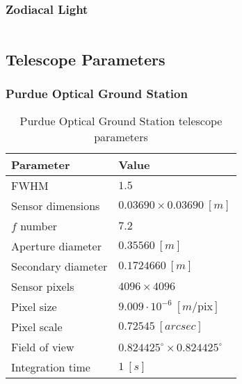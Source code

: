 \subsubsection{Zodiacal Light} \label{data:roach_zod}
\begin{listing}[H]
\inputminted[breaklines=true, breakanywhere=true, breaksymbol=\hspace{0pt}, fontsize=\footnotesize]{json}{/Users/liamrobinson/Documents/PyLightCurves/pyspaceaware/resources/data/zodiacal.json}
\end{listing}

\subsection{Telescope Parameters}

\subsubsection{Purdue Optical Ground Station}

\begin{table}[ht] \label{tb:pogs_parameters}
    \begin{tabular}{|l|l|}
    \hline
    \textbf{Parameter} & \textbf{Value} \\ \hline
    FWHM                & $1.5$                              \\ \hline
    Sensor dimensions    & $ 0.03690 \times 0.03690 \: [m]$                               \\ \hline
    $f$ number   & $7.2$                              \\ \hline
    Aperture diameter        & $0.35560 \: [m]$                              \\ \hline
    Secondary diameter         & $0.1724660 \: [m]$                              \\ \hline
    Sensor pixels               & $4096 \times 4096$                              \\ \hline
    Pixel size               & $9.009 \cdot 10^{-6} \: [m / \textrm{pix}]$                              \\ \hline
    Pixel scale               & $0.72545 \: [arcsec]$                              \\ \hline
    Field of view               & $0.824425^\circ \times 0.824425^\circ$                              \\ \hline
    Integration time               & $1 \: [s]$                              \\ \hline
    \end{tabular}
    \caption{Purdue Optical Ground Station telescope parameters}
  \end{table}


